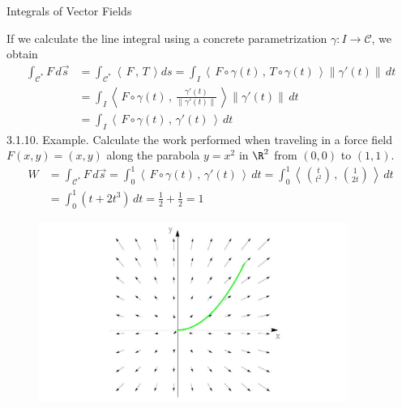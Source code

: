 \documentclass[smaller,hyperref={CJKbookmarks=true}]{beamer}
\newcommand{\scp}[2]{\left\langle\,#1\,,\,#2\,\right\rangle} \newcommand{\scpp}{\langle\,\cdot\,,\,\cdot\,\rangle}
\begin{document}
\begin{frame}{Integrals of Vector Fields}
\begin{spacing}{1}
If we calculate the line integral using a concrete parametrization $\gamma:I\to\mathcal{C}$, we obtain
\begin{equation}\label{3.1.6}
  \begin{split}
     \int_{\mathcal{C}^*}F\,d\vec{s} &=\int_{\mathcal{C}^*}\scp{F}{T}ds=
     \int_{I}\scp{F\circ\gamma(t)}{T\circ\gamma(t)}
     \|\gamma'(t)\|\,dt \\
       &=\int_{I}\scp{F\circ\gamma(t)}{\frac{\gamma'(t)}{\|\gamma'(t)\|}}\|\gamma'(t)\|\,dt  \\
       &=\int_{I}\scp{F\circ\gamma(t)}{\gamma'(t)}\,dt
  \end{split}
\end{equation}
\alert{3.1.10. Example.} Calculate the work performed when traveling in a force
field $F(x,y)=(x,y)$ along the parabola $y=x^2$ in $\R^2$ from $(0,0)$ to $(1,1)$.
\begin{equation*}
  \begin{split}
     W &=\int_{\mathcal{C}^*}F\,d\vec{s}
     =\int_{0}^{1}\scp{F\circ\gamma(t)}{\gamma'(t)}\,dt
     =\int_{0}^{1}\scp{\binom{t}{t^2}}{\binom{1}{2t}}\,dt  \\
       &=\int_{0}^{1}(t+2t^3)\,dt=\frac{1}{2}+\frac{1}{2}=1
  \end{split}
\end{equation*}
\newpage
\begin{figure}
  \centering
  \includegraphics[width=0.9\textwidth]{66.jpg}

\end{figure}
\end{spacing}
\end{frame}
\end{document}
